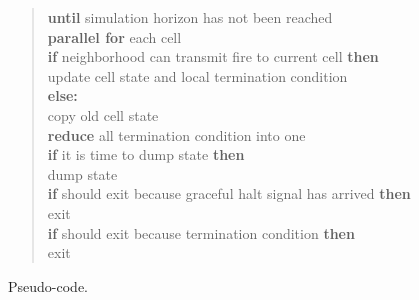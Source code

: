 \documentclass[Lau]{sapthesis} %
\begin{document}
\begin{figure}
\centering
\begin{verse}
\textbf{until} simulation horizon has not been reached\\
\hspace{2em} \textbf{parallel for} each cell\\
\hspace{2em}\hspace{2em} \textbf{if} neighborhood can transmit fire to current cell \textbf{then}\\
\hspace{2em}\hspace{2em}\hspace{2em} update cell state and local termination condition\\
\hspace{2em}\hspace{2em} \textbf{else:}\\
\hspace{2em}\hspace{2em}\hspace{2em} copy old cell state\\
\hspace{2em} \textbf{reduce} all termination condition into one\\
\hspace{2em} \textbf{if} it is time to dump state \textbf{then}\\
\hspace{2em}\hspace{2em} dump state\\
\hspace{2em} \textbf{if} should exit because graceful halt signal has arrived \textbf{then}\\
\hspace{2em}\hspace{2em} exit\\
\hspace{2em} \textbf{if} should exit because termination condition \textbf{then}\\
\hspace{2em}\hspace{2em} exit
\end{verse}
\caption{Pseudo-code.}
\label{fig:code}
\end{figure}
\end{document}
